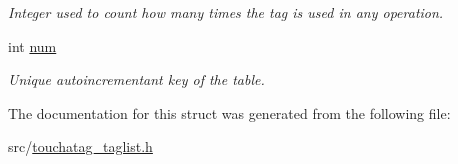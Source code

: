 \begin{DoxyCompactItemize}
\begin{DoxyCompactList}\small\item\em Integer used to count how many times the tag is used in any operation. \item\end{DoxyCompactList}\item 
\hypertarget{structlist__s_a6f5bf352a013122760a5672d8cc4bb15}{
int \hyperlink{structlist__s_a6f5bf352a013122760a5672d8cc4bb15}{num}}
\label{structlist__s_a6f5bf352a013122760a5672d8cc4bb15}

\begin{DoxyCompactList}\small\item\em Unique autoincrementant key of the table. \item\end{DoxyCompactList}\end{DoxyCompactItemize}


The documentation for this struct was generated from the following file:\begin{DoxyCompactItemize}
\item 
src/\hyperlink{touchatag__taglist_8h}{touchatag\_\-taglist.h}\end{DoxyCompactItemize}
